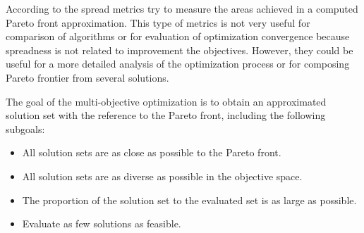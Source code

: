             According to \cite{CustodioMVV11} the spread metrics try to measure the areas achieved in a computed Pareto front approximation. This type of metrics is not very useful for comparison of algorithms or for evaluation of optimization convergence because spreadness is not related to improvement the objectives. However, they could be useful for a more detailed analysis of the optimization process or for composing Pareto frontier from several solutions.

            The goal of the multi-objective optimization is to obtain an approximated solution set with the reference to the Pareto front, including the following subgoals:
            \begin{itemize}
                \item All solution sets are as close as possible to the Pareto front.
                \item All solution sets are as diverse as possible in the objective space.
                \item The proportion of the solution set to the evaluated set is as large as possible. 
                \item Evaluate as few solutions as feasible.
            \end{itemize}

